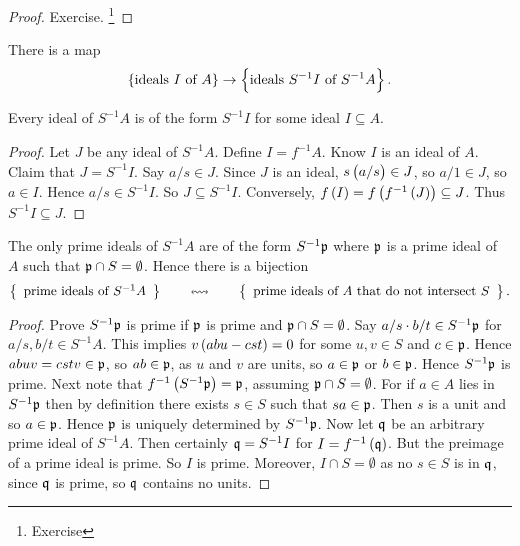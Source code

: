 \begin{proof}
Exercise. \footnote{Exercise}
\end{proof}

There is a map
$$ \cbr{\text{ideals} \ I \ \text{of} \ A} \to \cbr{\text{ideals} \ S^{-1}I \ \text{of} \ S^{-1}A}. $$

\begin{proposition}
Every ideal of $ S^{-1}A $ is of the form $ S^{-1}I $ for some ideal $ I \subseteq A $.
\end{proposition}

\begin{proof}
Let $ J $ be any ideal of $ S^{-1}A $. Define $ I = f^{-1}A $. Know $ I $ is an ideal of $ A $. Claim that $ J = S^{-1}I $. Say $ a / s \in J $. Since $ J $ is an ideal, $ s\br{a / s} \in J $, so $ a / 1 \in J $, so $ a \in I $. Hence $ a / s \in S^{-1}I $. So $ J \subseteq S^{-1}I $. Conversely, $ f\br{I} = f\br{f^{-1}\br{J}} \subseteq J $. Thus $ S^{-1}I \subseteq J $.
\end{proof}

\begin{theorem}
\label{thm:6.9}
The only prime ideals of $ S^{-1}A $ are of the form $ S^{-1}\mathfrak{p} $ where $ \mathfrak{p} $ is a prime ideal of $ A $ such that $ \mathfrak{p} \cap S = \emptyset $. Hence there is a bijection
$$ \correspondence{\text{prime ideals of} \ S^{-1}A}{\text{prime ideals of} \ A \ \text{that do not intersect} \ S}. $$
\end{theorem}

\begin{proof}
Prove $ S^{-1}\mathfrak{p} $ is prime if $ \mathfrak{p} $ is prime and $ \mathfrak{p} \cap S = \emptyset $. Say $ a / s \cdot b / t \in S^{-1}\mathfrak{p} $ for $ a / s, b / t \in S^{-1}A $. This implies $ v\br{abu - cst} = 0 $ for some $ u, v \in S $ and $ c \in \mathfrak{p} $. Hence $ abuv = cstv \in \mathfrak{p} $, so $ ab \in \mathfrak{p} $, as $ u $ and $ v $ are units, so $ a \in \mathfrak{p} $ or $ b \in \mathfrak{p} $. Hence $ S^{-1}\mathfrak{p} $ is prime. Next note that $ f^{-1}\br{S^{-1}\ppp} = \ppp $, assuming $ \mathfrak{p} \cap S = \emptyset $. For if $ a \in A $ lies in $ S^{-1}\mathfrak{p} $ then by definition there exists $ s \in S $ such that $ sa \in \mathfrak{p} $. Then $ s $ is a unit and so $ a \in \mathfrak{p} $. Hence $ \mathfrak{p} $ is uniquely determined by $ S^{-1}\mathfrak{p} $. Now let $ \mathfrak{q} $ be an arbitrary prime ideal of $ S^{-1}A $. Then certainly $ \mathfrak{q} = S^{-1}I $ for $ I = f^{-1}\br{\qqq} $. But the preimage of a prime ideal is prime. So $ I $ is prime. Moreover, $ I \cap S = \emptyset $ as no $ s \in S $ is in $ \mathfrak{q} $, since $ \mathfrak{q} $ is prime, so $ \mathfrak{q} $ contains no units.
\end{proof}

